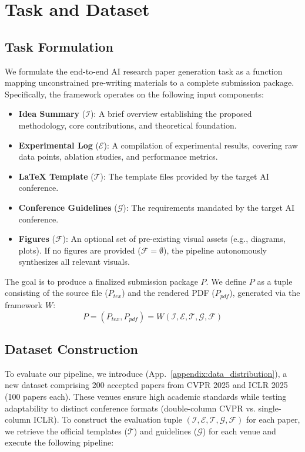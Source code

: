 \section{Task and Dataset}
\subsection{Task Formulation}
We formulate the end-to-end AI research paper generation task as a function mapping unconstrained pre-writing materials to a complete submission package. Specifically, the framework operates on the following input components:

\begin{itemize}
    \item \textbf{Idea Summary} ($\mathcal{I}$): A brief overview establishing the proposed methodology, core contributions, and theoretical foundation.
    \item \textbf{Experimental Log} ($\mathcal{E}$): A compilation of experimental results, covering raw data points, ablation studies, and performance metrics.
    \item \textbf{LaTeX Template} ($\mathcal{T}$): The template files provided by the target AI conference.
    \item \textbf{Conference Guidelines} ($\mathcal{G}$): The requirements mandated by the target AI conference.
    \item \textbf{Figures} ($\mathcal{F}$): An optional set of pre-existing visual assets (e.g., diagrams, plots). If no figures are provided ($\mathcal{F} = \emptyset$), the pipeline autonomously synthesizes all relevant visuals.
\end{itemize}

The goal is to produce a finalized submission package $P$. We define $P$ as a tuple consisting of the source \mylatex{} file ($P_\textit{tex}$) and the rendered PDF ($P_{\textit{pdf}}$), generated via the framework $W$:
\begin{equation}
    P = (P_\textit{tex}, P_{\textit{pdf}}) = W(\mathcal{I}, \mathcal{E}, \mathcal{T}, \mathcal{G}, \mathcal{F})
\end{equation}

\subsection{Dataset Construction}
To evaluate our pipeline, we introduce \ourdataset{} (App.~\ref{appendix:data_distribution}), a new dataset comprising 200 accepted papers from CVPR 2025 and ICLR 2025 (100 papers each). These venues ensure high academic standards while testing adaptability to distinct conference formats (double-column CVPR vs. single-column ICLR). To construct the evaluation tuple $(\mathcal{I}, \mathcal{E}, \mathcal{T}, \mathcal{G}, \mathcal{F})$ for each paper, we retrieve the official \mylatex{} templates ($\mathcal{T}$) and guidelines ($\mathcal{G}$) for each venue and execute the following pipeline:

